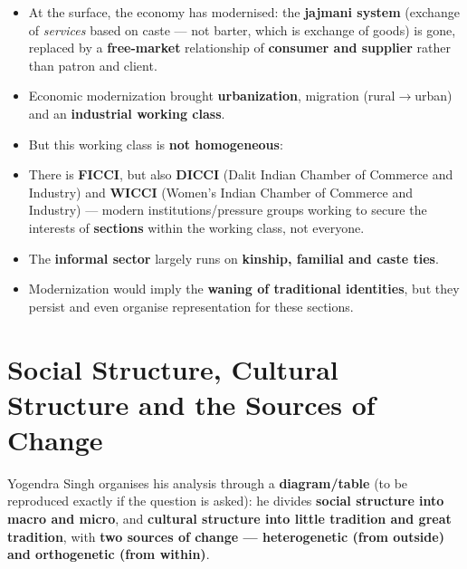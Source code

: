 \begin{KeyConcept}
\begin{itemize}
\item At the surface, the economy has modernised: the \textbf{jajmani system} (exchange of \emph{services} based on caste --- not barter, which is exchange of goods) is gone, replaced by a \textbf{free-market} relationship of \textbf{consumer and supplier} rather than patron and client.
\item Economic modernization brought \textbf{urbanization}, migration (rural$\rightarrow$urban) and an \textbf{industrial working class}.
\item But this working class is \textbf{not homogeneous}:
\item There is \textbf{FICCI}, but also \textbf{DICCI} (Dalit Indian Chamber of Commerce and Industry) and \textbf{WICCI} (Women's Indian Chamber of Commerce and Industry) --- modern institutions/pressure groups working to secure the interests of \textbf{sections} within the working class, not everyone.
\item The \textbf{informal sector} largely runs on \textbf{kinship, familial and caste ties}.
\item Modernization would imply the \textbf{waning of traditional identities}, but they persist and even organise representation for these sections.
\end{itemize}
\end{KeyConcept}

\section{Social Structure, Cultural Structure and the Sources of Change}

Yogendra Singh organises his analysis through a \textbf{diagram/table} (to be reproduced exactly if the question is asked): he divides \textbf{social structure into macro and micro}, and \textbf{cultural structure into little tradition and great tradition}, with \textbf{two sources of change --- heterogenetic (from outside) and orthogenetic (from within)}.

